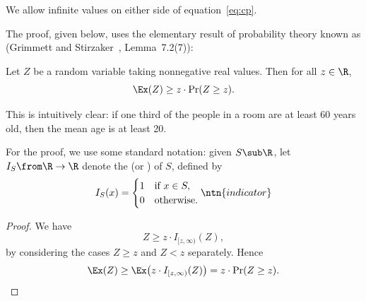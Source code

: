 We allow infinite values on either side of equation~\eqref{eq:cp}.

The proof, given below, uses the elementary result of probability theory
known as  (Grimmett and Stirzaker~\cite{GrSt},
Lemma~7.2(7)):

\begin{lemma}[Markov] 
%
%
%
Let $Z$ be a random variable taking nonnegative real values.  Then for all
$z \in \R$,
\[
\Ex(Z) \geq z \cdot \Pr(Z \geq z).
\]
\end{lemma}

This is intuitively clear: if one third of the people in a room are at
least 60 years old, then the mean age is at least 20.

For the proof, we use some standard notation: given $S \sub \R$, let
$I_S \from \R \to \R$ denote the  (or ) of $S$, defined by
\[
I_S(x)
=
\begin{cases}
1       &\text{if } x \in S,    \\
0       &\text{otherwise}.
\end{cases}
\ntn{indicator}
\]

\begin{proof}
We have
\[
Z 
\geq 
z \cdot I_{[z, \infty)}(Z),
\]
by considering the cases $Z \geq z$ and $Z < z$ separately.  Hence
\[
\Ex(Z) 
\geq
\Ex\bigl( 
z \cdot I_{[z, \infty)}(Z)
\bigr)
=
z \cdot \Pr(Z \geq z).
\]
\end{proof}

